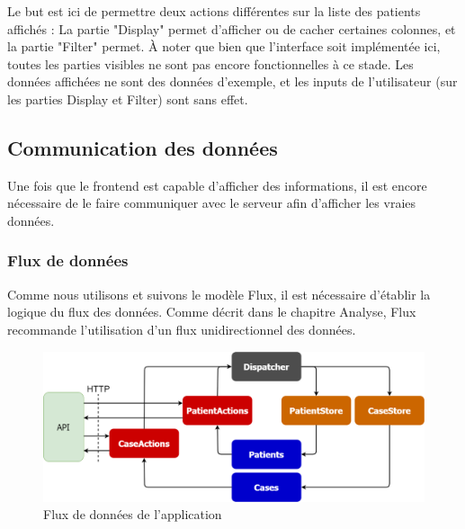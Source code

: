 		Le but est ici de permettre deux actions différentes sur la liste des patients affichés : La partie "Display" permet d'afficher ou de cacher certaines colonnes, et la partie "Filter" permet. À noter que bien que l'interface soit implémentée ici, toutes les parties visibles ne sont pas encore fonctionnelles à ce stade. Les données affichées ne sont des données d'exemple, et les inputs de l'utilisateur (sur les parties Display et Filter) sont sans effet.

	\subsection{Communication des données}

		Une fois que le frontend est capable d'afficher des informations, il est encore nécessaire de le faire communiquer avec le serveur afin d'afficher les vraies données.

		\subsubsection{Flux de données}

			Comme nous utilisons et suivons le modèle Flux, il est nécessaire d'établir la logique du flux des données. Comme décrit dans le chapitre Analyse, Flux recommande l'utilisation d'un flux unidirectionnel des données.

			\begin{figure}[!ht]
				\centering
				\includegraphics[width=1\textwidth]{images/realisation/vismedflux}
				\caption{Flux de données de l'application}
				\label{vismedflux}
			\end{figure}

